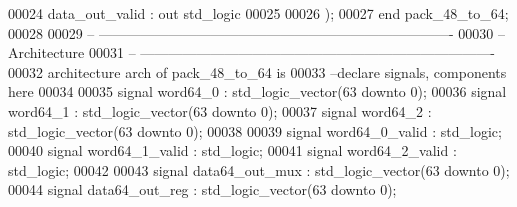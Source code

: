 \begin{DoxyCode}
00024         \textcolor{vhdlchar}{data_out_valid}  \textcolor{vhdlchar}{:} \textcolor{keywordflow}{out} \textcolor{comment}{std\_logic}
00025        
00026         \textcolor{vhdlchar}{)};
00027 \textcolor{keywordflow}{end} \textcolor{vhdlchar}{pack\_48\_to\_64};
00028 
00029 \textcolor{keyword}{-- ----------------------------------------------------------------------------}
00030 \textcolor{keyword}{-- Architecture}
00031 \textcolor{keyword}{-- ----------------------------------------------------------------------------}
00032 \textcolor{keywordflow}{architecture} arch \textcolor{keywordflow}{of} pack_48_to_64 is
00033 \textcolor{keyword}{--declare signals,  components here}
00034 
00035 \textcolor{keywordflow}{signal} \textcolor{vhdlchar}{word64_0}           \textcolor{vhdlchar}{:} \textcolor{comment}{std\_logic\_vector}\textcolor{vhdlchar}{(}\textcolor{vhdllogic}{}\textcolor{vhdllogic}{63} \textcolor{keywordflow}{downto} \textcolor{vhdllogic}{}\textcolor{vhdllogic}{0}\textcolor{vhdlchar}{)};
00036 \textcolor{keywordflow}{signal} \textcolor{vhdlchar}{word64_1}           \textcolor{vhdlchar}{:} \textcolor{comment}{std\_logic\_vector}\textcolor{vhdlchar}{(}\textcolor{vhdllogic}{}\textcolor{vhdllogic}{63} \textcolor{keywordflow}{downto} \textcolor{vhdllogic}{}\textcolor{vhdllogic}{0}\textcolor{vhdlchar}{)};
00037 \textcolor{keywordflow}{signal} \textcolor{vhdlchar}{word64_2}           \textcolor{vhdlchar}{:} \textcolor{comment}{std\_logic\_vector}\textcolor{vhdlchar}{(}\textcolor{vhdllogic}{}\textcolor{vhdllogic}{63} \textcolor{keywordflow}{downto} \textcolor{vhdllogic}{}\textcolor{vhdllogic}{0}\textcolor{vhdlchar}{)};
00038 
00039 \textcolor{keywordflow}{signal} \textcolor{vhdlchar}{word64_0_valid}      \textcolor{vhdlchar}{:} \textcolor{comment}{std\_logic};
00040 \textcolor{keywordflow}{signal} \textcolor{vhdlchar}{word64_1_valid}      \textcolor{vhdlchar}{:} \textcolor{comment}{std\_logic};
00041 \textcolor{keywordflow}{signal} \textcolor{vhdlchar}{word64_2_valid}      \textcolor{vhdlchar}{:} \textcolor{comment}{std\_logic};
00042 
00043 \textcolor{keywordflow}{signal} \textcolor{vhdlchar}{data64_out_mux}      \textcolor{vhdlchar}{:} \textcolor{comment}{std\_logic\_vector}\textcolor{vhdlchar}{(}\textcolor{vhdllogic}{}\textcolor{vhdllogic}{63} \textcolor{keywordflow}{downto} \textcolor{vhdllogic}{}\textcolor{vhdllogic}{0}\textcolor{vhdlchar}{)};
00044 \textcolor{keywordflow}{signal} \textcolor{vhdlchar}{data64_out_reg}      \textcolor{vhdlchar}{:} \textcolor{comment}{std\_logic\_vector}\textcolor{vhdlchar}{(}\textcolor{vhdllogic}{}\textcolor{vhdllogic}{63} \textcolor{keywordflow}{downto} \textcolor{vhdllogic}{}\textcolor{vhdllogic}{0}\textcolor{vhdlchar}{)};

\end{DoxyCode}
